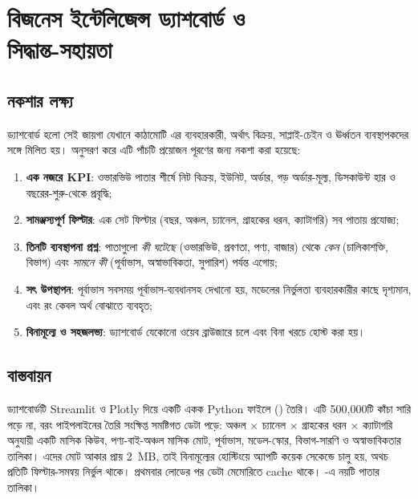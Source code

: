 \chapter[বিজনেস ইন্টেলিজেন্স ড্যাশবোর্ড ও সিদ্ধান্ত-সহায়তা]{বিজনেস ইন্টেলিজেন্স ড্যাশবোর্ড ও\\ সিদ্ধান্ত-সহায়তা}\label{ch:dashboard}

\section{নকশার লক্ষ্য}
ড্যাশবোর্ড হলো সেই জায়গা যেখানে কাঠামোটি এর ব্যবহারকারী, অর্থাৎ বিক্রয়, সাপ্লাই-চেইন ও ঊর্ধ্বতন ব্যবস্থাপকদের সঙ্গে মিলিত হয়।
\citet{few2013} অনুসরণ করে এটি পাঁচটি প্রয়োজন পূরণের জন্য নকশা করা হয়েছে:
\begin{enumerate}
  \item \textbf{এক নজরে KPI}: ওভারভিউ পাতার শীর্ষে নিট বিক্রয়, ইউনিট, অর্ডার, গড় অর্ডার-মূল্য, ডিসকাউন্ট হার ও বছরের-শুরু-থেকে প্রবৃদ্ধি;
  \item \textbf{সামঞ্জস্যপূর্ণ ফিল্টার}: এক সেট ফিল্টার (বছর, অঞ্চল, চ্যানেল, গ্রাহকের ধরন, ক্যাটাগরি) সব পাতায় প্রযোজ্য;
  \item \textbf{তিনটি ব্যবস্থাপনা প্রশ্ন}: পাতাগুলো \emph{কী ঘটেছে} (ওভারভিউ, প্রবণতা, পণ্য, বাজার) থেকে \emph{কেন} (চালিকাশক্তি,
        বিভাগ) এবং \emph{সামনে কী} (পূর্বাভাস, অস্বাভাবিকতা, সুপারিশ) পর্যন্ত এগোয়;
  \item \textbf{সৎ উপস্থাপন}: পূর্বাভাস সবসময় পূর্বাভাস-ব্যবধানসহ দেখানো হয়, মডেলের নির্ভুলতা ব্যবহারকারীর কাছে দৃশ্যমান, এবং রং কেবল
        অর্থ বোঝাতে ব্যবহৃত;
  \item \textbf{বিনামূল্যে ও সহজলভ্য}: ড্যাশবোর্ড যেকোনো ওয়েব ব্রাউজারে চলে এবং বিনা খরচে হোস্ট করা হয়।
\end{enumerate}

\section{বাস্তবায়ন}
ড্যাশবোর্ডটি Streamlit ও Plotly দিয়ে একটি একক Python ফাইলে () তৈরি। এটি 500,000টি কাঁচা সারি পড়ে না, বরং
পাইপলাইনের তৈরি সংক্ষিপ্ত সমষ্টিগত ডেটা পড়ে: অঞ্চল $\times$ চ্যানেল $\times$ গ্রাহকের ধরন $\times$ ক্যাটাগরি অনুযায়ী একটি মাসিক
কিউব, পণ্য-বাই-অঞ্চল মাসিক মোট, পূর্বাভাস, মডেল-স্কোর, বিভাগ-সারণি ও অস্বাভাবিকতার তালিকা। এদের মোট আকার প্রায় 2~MB, তাই বিনামূল্যের
হোস্টিংয়ে অ্যাপটি কয়েক সেকেন্ডে চালু হয়, অথচ প্রতিটি ফিল্টার-সমন্বয় নির্ভুল থাকে। প্রথমবার লোডের পর ডেটা মেমোরিতে cache থাকে।
-এ নয়টি পাতার তালিকা।

